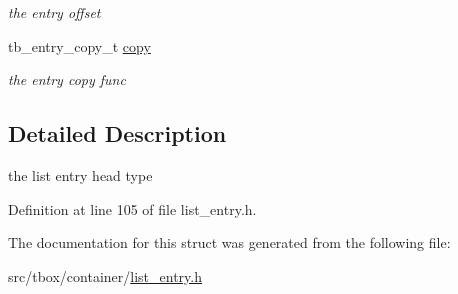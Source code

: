 \begin{DoxyCompactItemize}
\begin{DoxyCompactList}\small\item\em the entry offset \end{DoxyCompactList}\item 
\hypertarget{structtb__list__entry__head__t_a40c68fa5d753275cd41394fc9e757bca}{tb\-\_\-entry\-\_\-copy\-\_\-t \hyperlink{structtb__list__entry__head__t_a40c68fa5d753275cd41394fc9e757bca}{copy}}\label{structtb__list__entry__head__t_a40c68fa5d753275cd41394fc9e757bca}

\begin{DoxyCompactList}\small\item\em the entry copy func \end{DoxyCompactList}\end{DoxyCompactItemize}


\subsection{Detailed Description}
the list entry head type 

Definition at line 105 of file list\-\_\-entry.\-h.



The documentation for this struct was generated from the following file\-:\begin{DoxyCompactItemize}
\item 
src/tbox/container/\hyperlink{list__entry_8h}{list\-\_\-entry.\-h}\end{DoxyCompactItemize}
